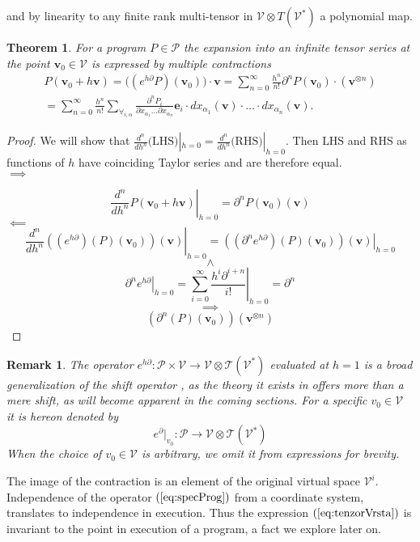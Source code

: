 \documentclass[smallcondensed]{svjour3}
\newcommand{\T}{\mathcal{T}}
\newcommand{\VV}{\mathcal{V}}
\newcommand{\e}{\mathbf{e}}
\newcommand{\vv}{\mathbf{v}}
\newcommand{\dP}{\mathcal{P}}
\newcommand{\D}{\partial}
\newtheorem{izrek}{Theorem}[section]
\newtheorem{opomba}{Remark}[section]
\begin{document}
and by linearity to any finite rank multi-tensor in $\VV\otimes T(\VV^*)$ a
polynomial map.
 
\begin{izrek}\label{izr:e^d}
	For a program $P\in\dP$  the expansion into an infinite tensor series
  at the point $\vv_0\in \VV$ is expressed by multiple contractions 
	\begin{multline}\label{eq:tenzorVrsta}
	P(\vv_0+h\vv) = \Big((e^{h\D}P)(\vv_0)\Big)\cdot\vv
  = \sum_{n=0}^\infty\frac{h^n}{n!}\D^nP(\vv_0)\cdot (\vv^{\otimes n})\\
  = \sum_{n=0}^\infty \frac{h^n}{n!}\sum_{\forall_{i,\alpha}}\frac{\partial^nP_i}{\partial
 		    x_{\alpha_1}\ldots \partial x_{\alpha_n}}\e_i\cdot
 		  dx_{\alpha_1}(\vv)\cdot\ldots \cdot dx_{\alpha_n}(\vv).
	\end{multline}
\end{izrek}
 
 \begin{proof}
We will show that $\frac{d^n}{dh^n}\text{(LHS)}|_{h=0}=\frac{d^n}{dh^n}\text{(RHS)}|_{h=0}$. Then $\text{LHS}$ and $\text{RHS}$ as functions
of $h$ have coinciding Taylor series and are therefore equal.\\
 $\implies$
 
 $$\left. \frac{d^n}{dh^n}P(\vv_0+h\vv)\right|_{h=0}=\D^n P(\vv_0)(\vv)$$
 $\impliedby$
 $$\left. \frac{d^n}{dh^n}\left((e^{h\D})(P)(\vv_0)\right)(\vv)\right|_{h=0}=
\left. \left((\D^n e^{h\D})(P)(\vv_0)\right)(\vv)\right|_{h=0}$$
 $$\land$$
 $$\left. \D^ne^{h\D}\right| _{h=0}=\left. \sum\limits_{i=0}^{\infty}\frac{h^i\D^{i+n}}{i!}\right|_{h=0}=\D^n$$
 $$\implies$$
 $$\left(\D^n(P)(\vv_0)\right)(\vv^{\otimes n})$$
 \end{proof}
 \begin{opomba}
 The operator $e^{h\D}:\dP\times \VV\to \VV\otimes \T(\VV^*)$ evaluated at $h=1$ is a broad generalization of the shift operator \cite{OpCalc}, as the theory it exists in offers more than a mere shift, as will become apparent in the coming sections.
 For a specific $v_0\in\VV$ it is hereon denoted by
 \begin{equation}
 e^\D\vert_{v_0}:\dP\to \VV\otimes \T(\VV^*)
 \end{equation}
 When the choice of $v_0\in\VV$ is arbitrary, we omit it from expressions for brevity.
 \end{opomba}
 
 The image of the contraction is an element of the original virtual space $\VV^i$. Independence of the operator $(\ref{eq:specProg})$ from a coordinate system, translates to independence in execution. Thus the expression $(\ref{eq:tenzorVrsta})$ is invariant to the point in execution of a program, a fact we explore later on.  
 
\end{document}
